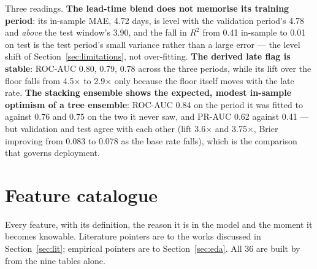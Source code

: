 Three readings. \textbf{The lead-time blend does not memorise its training
period}: its in-sample MAE, 4.72 days, is level with the validation period's
4.78 and \emph{above} the test window's 3.90, and the fall in $R^2$ from 0.41
in-sample to 0.01 on test is the test period's small variance rather than a
large error --- the level shift of Section~\ref{sec:limitations}, not
over-fitting. \textbf{The derived late flag is stable}: ROC-AUC 0.80, 0.79, 0.78
across the three periods, while its lift over the floor falls from 4.5$\times$
to 2.9$\times$ only because the floor itself moves with the late rate.
\textbf{The stacking ensemble shows the expected, modest in-sample optimism of a
tree ensemble}: ROC-AUC 0.84 on the period it was fitted to against 0.76 and
0.75 on the two it never saw, and PR-AUC 0.62 against 0.41 --- but validation
and test agree with each other (lift 3.6$\times$ and 3.75$\times$, Brier
improving from 0.083 to 0.078 as the base rate falls), which is the comparison
that governs deployment.

\section{Feature catalogue}
\label{app:features}

Every feature, with its definition, the reason it is in the model and the
moment it becomes knowable. Literature pointers are to the works discussed in
Section~\ref{sec:lit}; empirical pointers are to Section~\ref{sec:eda}. All 36
are built by  from the nine tables alone.

